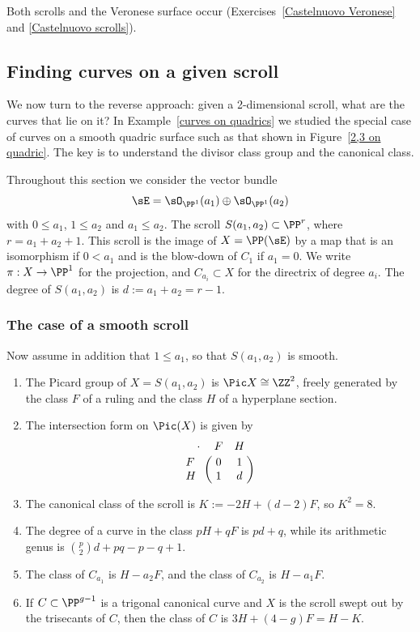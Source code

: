 Both scrolls and the Veronese surface occur (Exercises~\ref{Castelnuovo Veronese} and \ref{Castelnuovo scrolls}).

\subsection{Finding curves on a given scroll}

We now turn to the reverse approach: given a 2-dimensional scroll, what are the curves that lie on it?
In Example~\ref{curves on quadrics} we studied the special case of curves on a smooth quadric surface such as that shown in Figure~\ref{2,3 on quadric}.
The key is to understand the divisor class group and the canonical class.

 Throughout this section we consider the vector bundle 
$$
\sE = \sO_{\PP^1}(a_1) \oplus\sO_{\PP^1}(a_2)
$$
with  $0\leq a_1$, $1\leq a_2$ and  $a_{1}\leq a_{2}$. The 
scroll $ S(a_1, a_2) \subset \PP^r$, where $r= a_1+a_2+1$. This scroll is the image of $X = \PP(\sE)$ by a map that is an isomorphism
if $0<a_1$ and is the blow-down of  $C_1$ if $a_1=0$.  We write $\pi:X \to \PP^1$ for the projection, and
$C_{a_i}\subset X$ for the directrix of degree $a_i$. The degree of $S(a_1,a_2)$ is $d := a_1+a_2 = r-1$.

 \subsubsection{The case of a  smooth scroll}

Now assume in addition that $1\leq a_{1}$, so that $S(a_{1}, a_{2})$ is smooth.

\begin{theorem}\label{pic of scroll}

\begin{enumerate}

\item The Picard group of $X = S(a_1,a_2)$ is $\Pic X \cong \ZZ^2$, freely generated by  the class $F$ of a ruling and the class $H$ of a  hyperplane section. 
\item The
intersection form on $\Pic(X)$ is given by
$$
\bordermatrix{\kern 10pt\cdot&F&H\cr
F&0&1\cr
H&1&d
}
$$

\item The canonical class of the scroll is $K := -2H +(d-2)F$, so $K^2 = 8$.

\item The degree of a curve in the class $pH+qF$ is $pd+q$, while its arithmetic genus is
${p\choose 2}d+pq-p-q+1$.

\item The class of $C_{a_1}$
is $H-a_2F$, and the class of $C_{a_2}$
is $H-a_1F$. 
\item If $C \subset \PP^{g-1}$ is a trigonal canonical curve and $X$ is the scroll swept out by the trisecants of $C$, then the class of $C$ is $3H+(4-g)F = H-K$. 
\end{enumerate}
\end{theorem}

